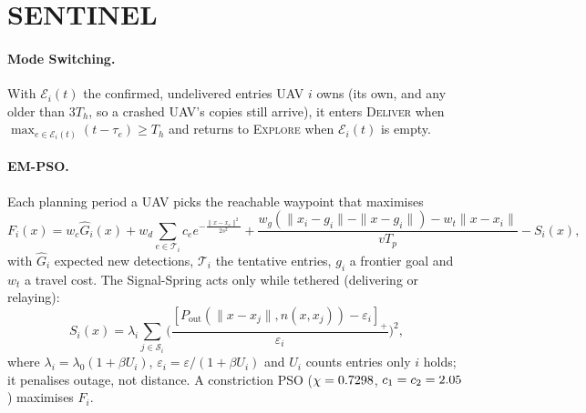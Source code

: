 \documentclass{IOS-Book-Article}
\newif\ifhighlight
\newenvironment{revised}{\ifhighlight\color{blue}\fi}{}
\begin{document}
\section{SENTINEL}\label{sec:method}
\begin{revised}
\paragraph{Mode Switching.} With $\mathcal{E}_i(t)$ the confirmed, undelivered entries UAV $i$ owns
(its own, and any older than $3T_h$, so a crashed UAV's copies still arrive), it enters \textsc{Deliver} when
$\max_{e\in\mathcal{E}_i(t)}(t-\tau_e)\ge T_h$ and returns to \textsc{Explore} when $\mathcal{E}_i(t)$ is empty.

\paragraph{EM-PSO.} Each planning period a UAV picks the reachable waypoint that maximises
\begin{equation}
F_i(x)=w_c\hat G_i(x)+w_d\!\!\sum_{e\in\mathcal{T}_i}\!c_e e^{-\frac{\|x-x_e\|^2}{2s^2}}
+\frac{w_g(\|x_i-g_i\|-\|x-g_i\|)-w_t\|x-x_i\|}{vT_p}-S_i(x),\label{eq:fitness}
\end{equation}
with $\hat G_i$ expected new detections, $\mathcal{T}_i$ the tentative entries, $g_i$ a frontier
goal and $w_t$ a travel cost. The Signal-Spring acts only while tethered (delivering or relaying):
\begin{equation}
S_i(x)=\lambda_i\sum_{j\in\mathcal{S}_i}\Big(\frac{[P_{\mathrm{out}}(\|x-x_j\|,n(x,x_j))-\varepsilon_i]_+}{\varepsilon_i}\Big)^2,\label{eq:spring}
\end{equation}
where $\lambda_i=\lambda_0(1+\beta U_i)$, $\varepsilon_i=\varepsilon/(1+\beta U_i)$ and $U_i$ counts
entries only $i$ holds; it penalises outage, not distance. A constriction PSO
($\chi=0.7298$, $c_1=c_2=2.05$) \cite{clerc2002} maximises $F_i$.


\end{revised}
\end{document}
